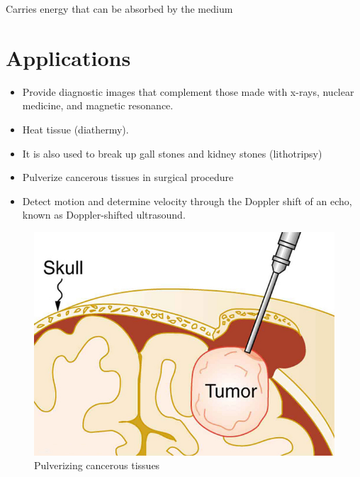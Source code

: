 \documentclass[12pt]{book}
\begin{document}
Carries energy that can be absorbed by the medium


\section*{Applications}


\begin{itemize}

\item Provide diagnostic images that complement
those made with x-rays, nuclear medicine, and magnetic
resonance.
\item Heat tissue (diathermy).
\item It is also used to break up gall stones and kidney stones
(lithotripsy)
\item Pulverize cancerous tissues in surgical procedure
\item Detect motion and determine velocity through the Doppler shift of an echo, known as Doppler-shifted ultrasound.
\end{itemize}

\begin{figure}
\centering
\includegraphics[scale=0.7]{pulverize.jpeg}
\caption{Pulverizing cancerous tissues}
\end{figure}
\end{document}
